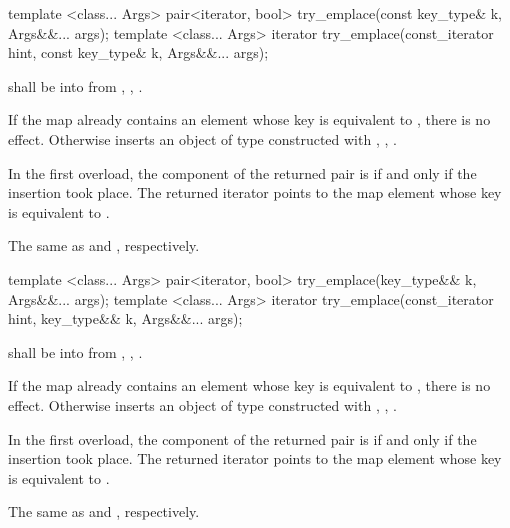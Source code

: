 %
\begin{itemdecl}
template <class... Args> pair<iterator, bool> try_emplace(const key_type& k, Args&&... args);
template <class... Args> iterator try_emplace(const_iterator hint, const key_type& k, Args&&... args);
\end{itemdecl}

\begin{itemdescr}
\pnum
\requires
{} shall be  into 
from , ,
.

\pnum
\effects
If the map already contains an element
whose key is equivalent to ,
there is no effect.
Otherwise inserts an object of type 
constructed with , ,
.

\pnum
\returns
In the first overload,
the  component of the returned pair is 
if and only if the insertion took place.
The returned iterator points to the map element
whose key is equivalent to .

\pnum
\complexity
The same as  and ,
respectively.
\end{itemdescr}

%
\begin{itemdecl}
template <class... Args> pair<iterator, bool> try_emplace(key_type&& k, Args&&... args);
template <class... Args> iterator try_emplace(const_iterator hint, key_type&& k, Args&&... args);
\end{itemdecl}

\begin{itemdescr}
\pnum
\requires
{} shall be  into 
from , ,
.

\pnum
\effects
If the map already contains an element
whose key is equivalent to ,
there is no effect.
Otherwise inserts an object of type 
constructed with , ,
.

\pnum
\returns
In the first overload,
the  component of the returned pair is 
if and only if the insertion took place.
The returned iterator points to the map element
whose key is equivalent to .

\pnum
\complexity
The same as  and ,
respectively.
\end{itemdescr}

